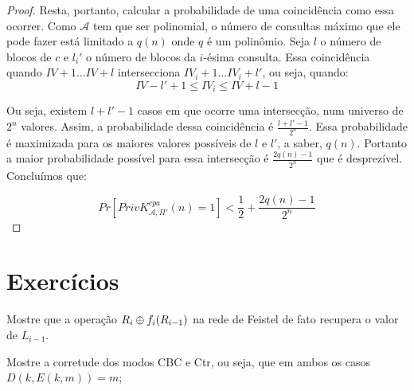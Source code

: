 \begin{proof}
Resta, portanto, calcular a probabilidade de uma coincidência como essa ocorrer.
Como $\mathcal{A}$ tem que ser polinomial, o número de consultas máximo que ele pode fazer está limitado a $q(n)$ onde $q$ é um polinômio.
Seja $l$ o número de blocos de $c$ e $l_i'$ o número de blocos da $i$-ésima consulta.
Essa coincidência quando $IV + 1 \dots IV + l$ intersecciona $IV_i + 1 \dots IV_i + l'$, ou seja, quando:
\begin{displaymath}
  IV - l' + 1 \leq IV_i \leq IV + l -1
\end{displaymath}

Ou seja, existem $l + l' - 1$ casos em que ocorre uma intersecção, num universo de $2^n$ valores.
Assim, a probabilidade dessa coincidência é $\frac{l + l' -1}{2^n}$.
Essa probabilidade é maximizada para os maiores valores possíveis de $l$ e $l'$, a saber, $q(n)$.
Portanto a maior probabilidade possível para essa intersecção é $\frac{2q(n) - 1}{2^n}$ que é desprezível.
Concluímos que:

\begin{displaymath}
Pr[PrivK^{cpa}_{\mathcal{A},\Pi'}(n) = 1] < \frac{1}{2} + \frac{2q(n) - 1}{2^n}
\end{displaymath}



\end{proof}


\section{Exercícios}
\label{sec:exercicios}

\begin{exercicio}
Mostre que a operação $R_i \oplus f_i(R_{i-1})$ na rede de Feistel de fato recupera o valor de $L_{i-1}$.
\end{exercicio}

\begin{exercicio}
  Mostre a corretude dos modos CBC e Ctr, ou seja, que em ambos os casos $D(k, E(k,m)) = m$;
\end{exercicio}
